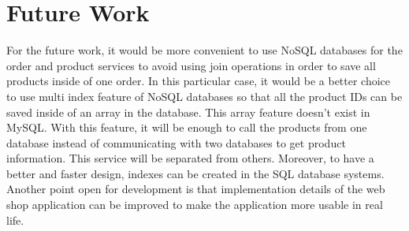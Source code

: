 \documentclass{article}
\begin{document}
\section{Future Work}
For the future work, it would be more convenient to use NoSQL databases for the order and product services to avoid using join operations in order to save all products inside of one order. In this particular case, it would be a better choice to use multi index feature of NoSQL databases so that all the product IDs can be saved inside of an array in the database. This array feature doesn't exist in MySQL. With this feature, it will be enough to call the products from one database instead of communicating with two databases to get product information. This service will be separated from others. Moreover, to have a better and faster design, indexes can be created in the SQL database systems. Another point open for development is that implementation details of the web shop application can be improved to make the application more usable in real life.


\pagebreak

\listoffigures
\pagebreak




\end{document}
